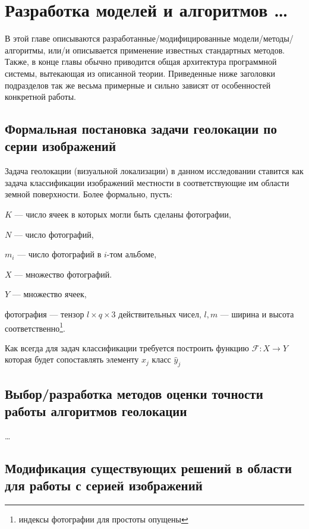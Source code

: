  \chapter{Разработка моделей и алгоритмов \dots}

В этой главе описываются разработанные/модифицированные модели/методы/
алгоритмы, или/и описывается применение известных стандартных методов. Также, 
в конце главы обычно приводится общая архитектура программной системы, 
вытекающая из описанной теории. Приведенные ниже заголовки подразделов так же 
весьма примерные и сильно зависят от особенностей конкретной работы.
\section{Формальная постановка задачи геолокации по серии изображений}

Задача геолокации (визуальной локализации) в данном исследовании ставится как задача классификации изображений местности в соответствующие им области земной поверхности. Более формально, пусть:

\begin{compactitem}
	\item $K$ --- число ячеек в которых могли быть сделаны фотографии,
	\item $N$ --- число фотографий,
	\item $m_i$ --- число фотографий в $i$-том альбоме,
	\item $X$ --- множество фотографий. 
	\item $ Y $ --- множество ячеек, 
\end{compactitem}

фотография --- тензор $ l \times q \times 3$  действительных чисел, $ l, m $ --- ширина 
и высота соответственно\footnote{индексы фотографии для простоты опущены}.

Как всегда для задач классификации требуется построить функцию $ \mathcal{F}: X \to Y $
которая будет сопоставлять элементу $ x_j $ класс $ \hat{y}_j $
\section{Выбор/разработка методов оценки точности работы алгоритмов геолокации}

\dots


\section{Модификация существующих решений в области для работы с серией изображений}

